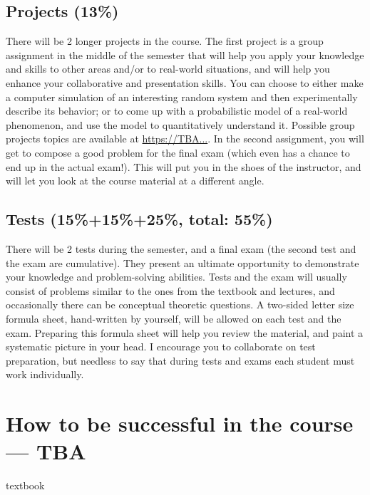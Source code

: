 \documentclass[oneside,11pt]{amsart}
\begin{document}
\subsection{Projects (13\%)}

There will be 2 longer projects in the course. 
The first project is a group assignment in the middle of the semester
that will help you apply your knowledge and skills
to other areas and/or to real-world situations,
and will help you enhance your collaborative and presentation skills.
You can choose to either make a computer simulation of an interesting random 
system and then experimentally describe its behavior;
or to come up with a probabilistic model of a real-world phenomenon, and 
use the model to quantitatively understand it.
Possible group projects topics are available at \url{https://TBA...}.
In the second assignment, you will get to compose a good problem for the final
exam (which even has a chance to end up in the actual exam!).
This will put you in the shoes of the instructor, and will 
let you look at the course material at a different angle.

\subsection{Tests (15\%+15\%+25\%, total: 55\%)}

There will be 2 tests during the semester, and a final exam (the second test and the exam are cumulative). 
They present an ultimate opportunity to demonstrate your knowledge and
problem-solving abilities. Tests and the exam will usually consist of problems similar to the 
ones from the textbook and lectures, and occasionally 
there can be conceptual theoretic questions.
A two-sided letter size 
formula sheet, hand-written by yourself, will be allowed on each test and the exam. 
Preparing this formula sheet will help you review the material,
and paint a systematic picture in your head.
I encourage you to collaborate on test preparation,
but needless to say that during tests and exams each student must work individually.

\section{How to be successful in the course --- TBA}

textbook


\end{document}
